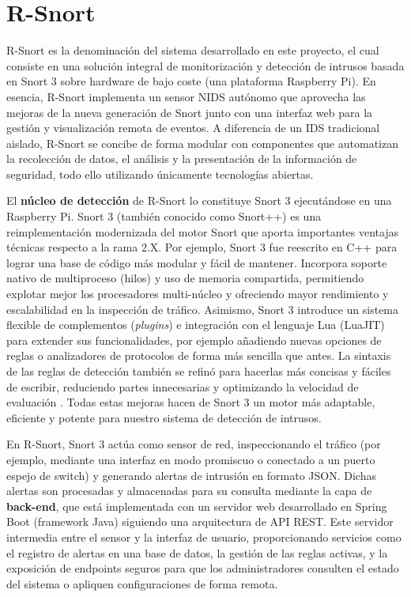 \documentclass[11pt,a4paper,twoside]{report}
\begin{document}
\section{R-Snort}

R-Snort es la denominación del sistema desarrollado en este proyecto, el cual consiste en una solución integral de monitorización y detección de intrusos basada en Snort 3 sobre hardware de bajo coste (una plataforma Raspberry Pi). En esencia, R-Snort implementa un sensor NIDS autónomo que aprovecha las mejoras de la nueva generación de Snort junto con una interfaz web para la gestión y visualización remota de eventos. A diferencia de un IDS tradicional aislado, R-Snort se concibe de forma modular con componentes que automatizan la recolección de datos, el análisis y la presentación de la información de seguridad, todo ello utilizando únicamente tecnologías abiertas.\newline

El \textbf{núcleo de detección} de R-Snort lo constituye Snort 3 ejecutándose en una Raspberry Pi. Snort 3 (también conocido como Snort++) es una reimplementación modernizada del motor Snort que aporta importantes ventajas técnicas respecto a la rama 2.X. Por ejemplo, Snort 3 fue reescrito en C++ para lograr una base de código más modular y fácil de mantener. Incorpora soporte nativo de multiproceso (hilos) y uso de memoria compartida, permitiendo explotar mejor los procesadores multi-núcleo y ofreciendo mayor rendimiento y escalabilidad en la inspección de tráfico. Asimismo, Snort 3 introduce un sistema flexible de complementos (\textit{plugins}) e integración con el lenguaje Lua (LuaJIT) para extender sus funcionalidades, por ejemplo añadiendo nuevas opciones de reglas o analizadores de protocolos de forma más sencilla que antes. La sintaxis de las reglas de detección también se refinó para hacerlas más concisas y fáciles de escribir, reduciendo partes innecesarias y optimizando la velocidad de evaluación \cite{Sakura2020}. Todas estas mejoras hacen de Snort 3 un motor más adaptable, eficiente y potente para nuestro sistema de detección de intrusos.\newline

En R-Snort, Snort 3 actúa como sensor de red, inspeccionando el tráfico (por ejemplo, mediante una interfaz en modo promiscuo o conectado a un puerto espejo de switch) y generando alertas de intrusión en formato JSON. Dichas alertas son procesadas y almacenadas para su consulta mediante la capa de \textbf{back-end}, que está implementada con un servidor web desarrollado en Spring Boot (framework Java) siguiendo una arquitectura de API REST. Este servidor intermedia entre el sensor y la interfaz de usuario, proporcionando servicios como el registro de alertas en una base de datos, la gestión de las reglas activas, y la exposición de endpoints seguros para que los administradores consulten el estado del sistema o apliquen configuraciones de forma remota.\newline
\end{document}
